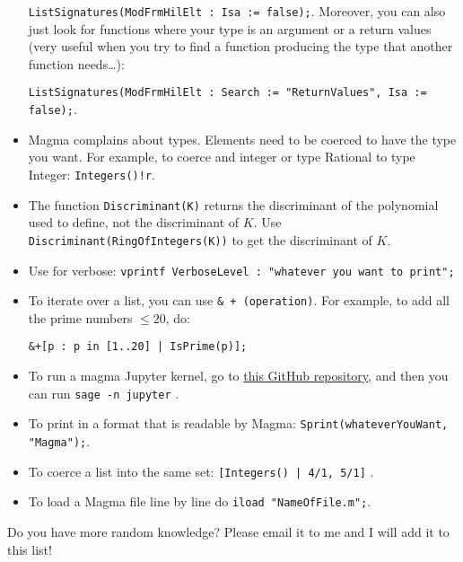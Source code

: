 \documentclass[12pt]{article}
\begin{document}
\begin{itemize}
\verb|ListSignatures(ModFrmHilElt : Isa := false);|.  Moreover, you can also just look for functions where your type is an argument or a return values (very useful when you try to find a function producing the type that another function needs…):

\verb|ListSignatures(ModFrmHilElt : Search := "ReturnValues", Isa := false);|.

\item \textsf{Magma} complains about types.  Elements need to be coerced to have the type you want. For example, to coerce and integer or type Rational  to type Integer: \verb|Integers()!r|.

\item The function \verb|Discriminant(K)| returns the discriminant of the polynomial used to define, not the discriminant of $K$. Use \verb|Discriminant(RingOfIntegers(K))| to get the discriminant of $K$.

\item Use for verbose: \verb|vprintf VerboseLevel : "whatever you want to print";|

\item To iterate over a list, you can use \verb|& + (operation)|.  For example, to add all the prime numbers $\le 20$, do: \begin{verbatim}&+[p : p in [1..20] | IsPrime(p)];\end{verbatim}

\item To run a magma Jupyter kernel, go to \href{https://github.com/edgarcosta/magma_kernel}{this GitHub repository}, and then you can run \verb|sage -n jupyter| .

\item To print in a format that is readable by \textsf{Magma}: \verb|Sprint(whateverYouWant, "Magma");|.

\item To coerce a list into the same set: 
\verb+[Integers() | 4/1, 5/1]+ .

\item To load a \textsf{Magma} file line by line do \verb|iload "NameOfFile.m";|.
\end{itemize}
Do you have more random knowledge? Please email it to me and I will add it to this list!
\end{document}
